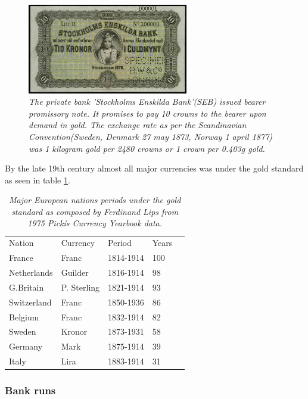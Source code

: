 \begin{figure}[!htb]
	\centering
	\includegraphics[width=7cm]{PrivateBankNoteStockholmEnskildaBank1876.JPG}
	\caption{\textit{The private bank 'Stockholms Enskilda Bank'(SEB) issued bearer
	promissory note. It promises to pay 10 crowns to the bearer upon demand in gold. 
	The exchange rate as per the Scandinavian Convention(Sweden, Denmark 27 may 1873, Norway 1 april 1877)\cite{nordic:crown}
	was 1 kilogram gold per 2480 crowns or 1 crown per 0.403g gold\cite{crown:gold}. 
 }}
	\label{fig:seb:promissory:note}
\end{figure}

By the late 19th century almost all major currencies was under the gold standard as seen in table \ref{tab:gold:standard}.

\begin{table}[!htb]
	\begin{tabular}{lllll}
		Nation & Currency & Period & Years \\
		France & Franc & 1814-1914 & 100 \\
		Netherlands & Guilder & 1816-1914 & 98 \\
		G.Britain & P. Sterling & 1821-1914 & 93 \\
		Switzerland & Franc & 1850-1936 & 86 \\
		Belgium & Franc & 1832-1914 & 82 \\
		Sweden & Kronor & 1873-1931 & 58 \\
		Germany & Mark & 1875-1914 & 39 \\
		Italy & Lira & 1883-1914 & 31 \\   
	\end{tabular}
	\caption{\textit{ Major European nations periods under the gold standard
			as composed by Ferdinand Lips\cite{lips:gold:wars} from 1975 Pickís Currency Yearbook data.
	}}
	\label{tab:gold:standard}
\end{table}

\subsubsection{Bank runs}

